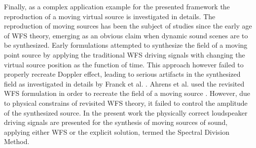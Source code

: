 Finally, as a complex application example for the presented framework the reproduction of a moving virtual source is investigated in details.
The reproduction of moving sources has been the subject of studies since the early age of WFS theory, emerging as an obvious claim when dynamic sound scenes are to be synthesized.
Early formulations attempted to synthesize the field of a moving point source by applying the traditional WFS driving signals with changing the virtual source position as the function of time.
This approach however failed to properly recreate Doppler effect, leading to serious artifacts in the synthesized field as investigated in details by Franck et al. \cite{Franck2007}.
Ahrens et al. used the revisited WFS formulation in order to recreate the field of a moving source \cite{Ahrens2008moving, Ahrens2008moving_b, Ahrens2012}.
However, due to physical constrains of revisited WFS theory, it failed to control the amplitude of the synthesized source.
In the present work the physically correct loudspeaker driving signals are presented for the synthesis of moving sources of sound, applying either WFS or  the explicit solution, termed the Spectral Division Method.

